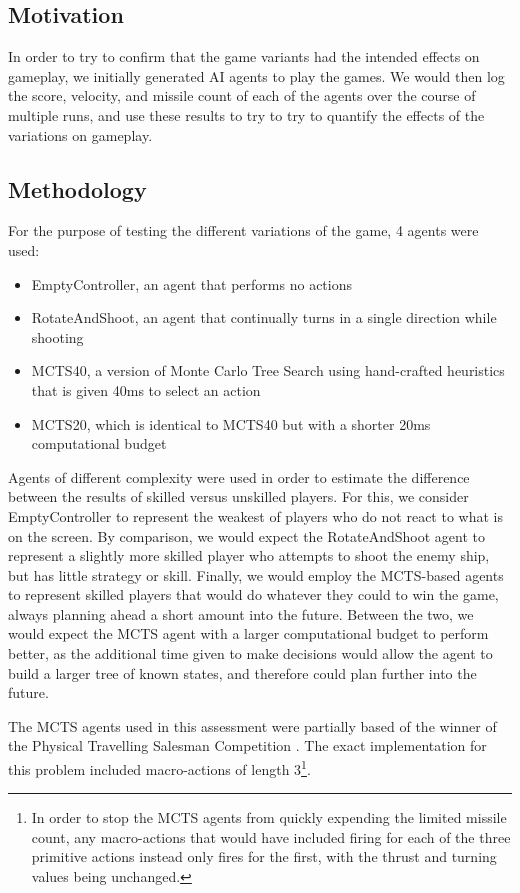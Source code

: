 \subsection{Motivation}

In order to try to confirm that the game variants had the intended effects on gameplay, we initially generated AI agents to play the games. We would then log the score, velocity, and missile count of each of the agents over the course of multiple runs, and use these results to try to try to quantify the effects of the variations on gameplay.

\subsection{Methodology}

For the purpose of testing the different variations of the game, 4 agents were used:
\begin{itemize}
	\item EmptyController, an agent that performs no actions
	\item RotateAndShoot, an agent that continually turns in a single direction while shooting
	\item MCTS40, a version of Monte Carlo Tree Search using hand-crafted heuristics that is given 40ms to select an action
	\item MCTS20, which is identical to MCTS40 but with a shorter 20ms computational budget
\end{itemize}

Agents of different complexity were used in order to estimate the difference between the results of skilled versus unskilled players. For this, we consider EmptyController to represent the weakest of players who do not react to what is on the screen. By comparison, we would expect the RotateAndShoot agent to represent a slightly more skilled player who attempts to shoot the enemy ship, but has little strategy or skill. Finally, we would employ the MCTS-based agents to represent skilled players that would do whatever they could to win the game, always planning ahead a short amount into the future. Between the two, we would expect the MCTS agent with a larger computational budget to perform better, as the additional time given to make decisions would allow the agent to build a larger tree of known states, and therefore could plan further into the future.

The MCTS agents used in this assessment were partially based of the winner of the Physical Travelling Salesman Competition \cite{6374161}. The exact implementation for this problem included macro-actions of length 3\footnote{In order to stop the MCTS agents from quickly expending the limited missile count, any macro-actions that would have included firing for each of the three primitive actions instead only fires for the first, with the thrust and turning values being unchanged.}. 

